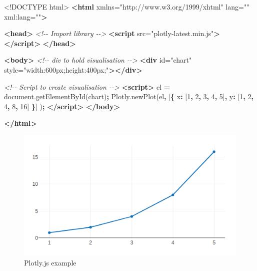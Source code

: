\documentclass[
]{krantz}
\makeatletter
\newenvironment{Shaded}{\begin{snugshade}}{\end{snugshade}}
\newcommand{\AttributeTok}[1]{\textcolor[rgb]{0.61,0.61,0.61}{#1}}
\newcommand{\CommentTok}[1]{\textcolor[rgb]{0.37,0.37,0.37}{\textit{#1}}}
\newcommand{\DataTypeTok}[1]{\textcolor[rgb]{0.27,0.27,0.27}{#1}}
\newcommand{\DecValTok}[1]{\textcolor[rgb]{0.06,0.06,0.06}{#1}}
\newcommand{\KeywordTok}[1]{\textcolor[rgb]{0.27,0.27,0.27}{\textbf{#1}}}
\newcommand{\NormalTok}[1]{#1}
\newcommand{\OperatorTok}[1]{\textcolor[rgb]{0.43,0.43,0.43}{\textbf{#1}}}
\newcommand{\OtherTok}[1]{\textcolor[rgb]{0.37,0.37,0.37}{#1}}
\newcommand{\StringTok}[1]{\textcolor[rgb]{0.5,0.5,0.5}{#1}}
\newcommand{\VariableTok}[1]{\textcolor[rgb]{0,0,0}{#1}}
\newenvironment{kframe}{%
\medskip{}
\setlength{\fboxsep}{.8em}
 \def\at@end@of@kframe{}%
 \ifinner\ifhmode%
  \def\at@end@of@kframe{\end{minipage}}%
  \begin{minipage}{\columnwidth}%
 \fi\fi%
 \def\FrameCommand##1{\hskip\@totalleftmargin \hskip-\fboxsep
 \colorbox{shadecolor}{##1}\hskip-\fboxsep
     \hskip-\linewidth \hskip-\@totalleftmargin \hskip\columnwidth}%
 \MakeFramed {\advance\hsize-\width
   \@totalleftmargin\z@ \linewidth\hsize
   \@setminipage}}%
 {\par\unskip\endMakeFramed%
 \at@end@of@kframe}
\renewenvironment{Shaded}{\begin{kframe}}{\end{kframe}}
\makeatother
\begin{document}
\begin{Shaded}
\begin{Highlighting}[]
\DataTypeTok{<!DOCTYPE }\NormalTok{html}\DataTypeTok{>}
\KeywordTok{<html}\OtherTok{ xmlns=}\StringTok{"http://www.w3.org/1999/xhtml"}\OtherTok{ lang=}\StringTok{""}\OtherTok{ xml:lang=}\StringTok{""}\KeywordTok{>}

\KeywordTok{<head>}
  \CommentTok{<!{-}{-} Import library {-}{-}>}
  \KeywordTok{<script}\OtherTok{ src=}\StringTok{"plotly{-}latest.min.js"}\KeywordTok{></script>}
\KeywordTok{</head>}

\KeywordTok{<body>}
  \CommentTok{<!{-}{-} div to hold visualisation {-}{-}>}
  \KeywordTok{<div}\OtherTok{ id=}\StringTok{"chart"}\OtherTok{ style=}\StringTok{"width:600px;height:400px;"}\KeywordTok{></div>}

  \CommentTok{<!{-}{-} Script to create visualisation {-}{-}>}
  \KeywordTok{<script>}
\NormalTok{    el }\OperatorTok{=} \VariableTok{document}\NormalTok{.}\AttributeTok{getElementById}\NormalTok{(}\StringTok{\textquotesingle{}chart\textquotesingle{}}\NormalTok{)}\OperatorTok{;}
    \VariableTok{Plotly}\NormalTok{.}\AttributeTok{newPlot}\NormalTok{(el}\OperatorTok{,}\NormalTok{ [}\OperatorTok{\{}
      \DataTypeTok{x}\OperatorTok{:}\NormalTok{ [}\DecValTok{1}\OperatorTok{,} \DecValTok{2}\OperatorTok{,} \DecValTok{3}\OperatorTok{,} \DecValTok{4}\OperatorTok{,} \DecValTok{5}\NormalTok{]}\OperatorTok{,}
      \DataTypeTok{y}\OperatorTok{:}\NormalTok{ [}\DecValTok{1}\OperatorTok{,} \DecValTok{2}\OperatorTok{,} \DecValTok{4}\OperatorTok{,} \DecValTok{8}\OperatorTok{,} \DecValTok{16}\NormalTok{] }\OperatorTok{\}}\NormalTok{]}
\NormalTok{    )}\OperatorTok{;}
  \KeywordTok{</script>}
\KeywordTok{</body>}

\KeywordTok{</html>}
\end{Highlighting}
\end{Shaded}

\begin{figure}
\centering
\includegraphics{images/candidate-plotly.png}
\caption{Plotly.js example}
\end{figure}
\end{document}
